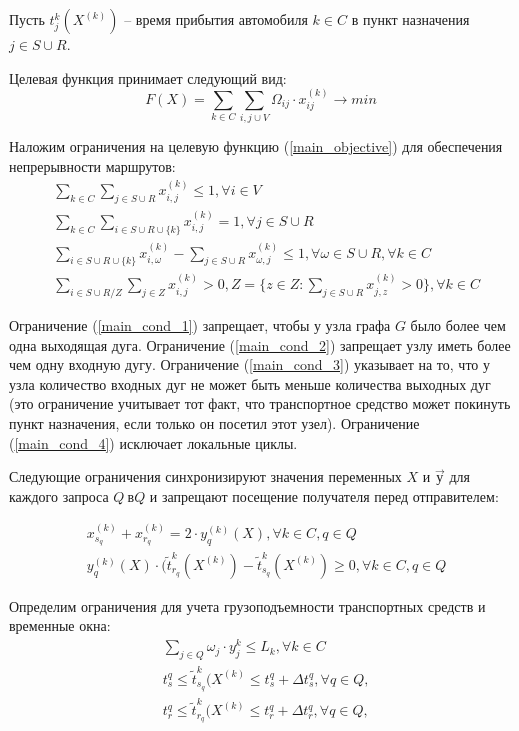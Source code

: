 \documentclass[]{TAACpaper}
\begin{document}
Пусть $t^k_j(X^{(k)})$ -- время прибытия автомобиля $k \in C$ в пункт назначения $j \in S \cup R$. 

Целевая функция принимает следующий вид:
\begin{equation} \label{main_objective}
  F(X) = 
    \sum_{k \in C}
     \sum_{i,j\cup{V}} 
     \Omega_{ij} \cdot x_{ij}^{(k)} 
     \to min
\end{equation}

Наложим ограничения на целевую функцию  (\ref{main_objective}) для обеспечения непрерывности маршрутов:
\begin{align} 
& \sum_{k \in C}\sum_{j \in S \cup R}x^{(k)}_{i,j} \leq 1, 
\forall i \in V \label{main_cond_1}\\
& \sum_{k \in C}\sum_{i \in S \cup R \cup \{k\} } x^{(k)}_{i,j} = 1, 
\forall j \in S \cup R \label{main_cond_2}\\
& \sum_{i \in S \cup R \cup \{k\} } x^{(k)}_{i,\omega} - 
\sum_{j \in S \cup R} x^{(k)}_{\omega,j} \leq 1, 
\forall \omega \in S \cup R,  \forall k \in C \label{main_cond_3}\\
&  \sum_{i \in S \cup R / Z}\sum_{j \in Z } x^{(k)}_{i,j} > 0, 
Z=\{z \in Z: \sum_{j \in S \cup R}x^{(k)}_{j,z}>0 \}  ,\forall k \in C \label{main_cond_4}
\end{align}

Ограничение (\ref{main_cond_1}) запрещает, чтобы у узла графа $G$ было более чем одна выходящая дуга. Ограничение (\ref {main_cond_2}) запрещает узлу иметь более чем одну входную дугу. Ограничение (\ref {main_cond_3}) указывает на то, что у узла количество входных дуг не может быть меньше количества выходных дуг (это ограничение учитывает тот факт, что транспортное средство может покинуть пункт назначения, если только он посетил этот узел). Ограничение (\ref {main_cond_4}) исключает локальные циклы.

Следующие ограничения синхронизируют значения переменных $X$ и $ \Vec{у} $ для каждого запроса $ Q \ в Q $ и запрещают посещение получателя перед отправителем:

\begin{align} 
& x^{(k)}_{s_q} + x^{(k)}_{r_q} = 2 \cdot y^{(k)}_{q}(X), \forall k \in C, q \in Q  \\
& y^{(k)}_{q}(X) \cdot (\tilde{t}^k_{r_q}(X^{(k)})-\tilde{t}^k_{s_q}(X^{(k)})\ge{0}, \forall k \in C, q \in Q
\end{align}

Определим ограничения для учета грузоподъемности транспортных средств и временные окна:
\begin{align} 
& \sum_{j\in{Q}} \omega_j \cdot y_{j}^{k} \leq L_k, \forall{k}\in{C}\\
& t_{s}^{q} \leq \tilde{t}^k_{s_q}(X^{(k)} \leq t_{s}^{q}+ \Delta{t_{s}^{q}}, \forall q \in Q, \label{tws_cond} \\
& t_{r}^{q} \leq \tilde{t}^k_{r_q}(X^{(k)} \leq t_{r}^{q}+ \Delta{t_{r}^{q}}, \forall q \in Q, \label{twr_cond}
\end{align}
\end{document}
